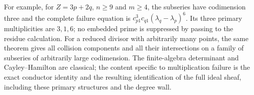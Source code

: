 For example, for $Z=3p+2q$, $n\ge9$ and $m\ge4$, the subseries
have codimension three and the complete failure equation is
$c_{p1}^{3}c_{q1}(\lambda_q-\lambda_p)^6$. Its three primary
multiplicities are $3,1,6$; no embedded prime is suppressed by
passing to the residue calculation. For a reduced divisor with
arbitrarily many points, the same theorem gives all collision
components and all their intersections on a family of subseries
of arbitrarily large codimension. The finite-algebra determinant
and Cayley--Hamilton are classical; the content specific to
multiplication failure is the exact conductor identity and the
resulting identification of the full ideal sheaf, including these
primary structures and the degree wall.
